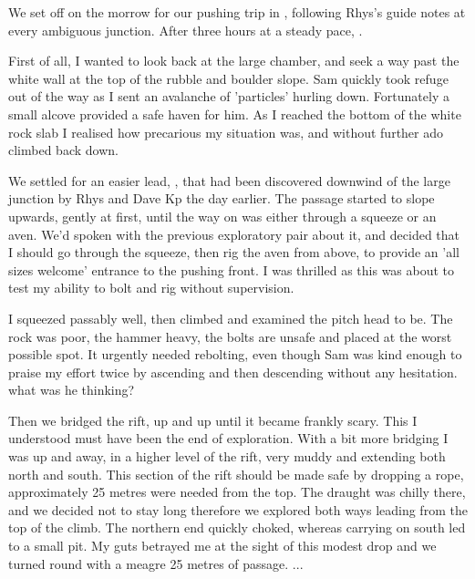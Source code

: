 We set off on the morrow for our pushing trip in , following Rhys's guide notes at every ambiguous junction. After three hours at a steady pace, .


First of all, I wanted to look back at the large  chamber, and seek a way past the white wall at the top of the rubble and boulder slope. Sam quickly took refuge out of the way as I sent an avalanche of 'particles' hurling down. Fortunately a small alcove provided a safe haven for him. As I reached the bottom of the white rock slab I realised how precarious my situation was, and without further ado climbed back down.

We settled for an easier lead, , that had been discovered downwind of the large junction by Rhys and Dave Kp the day earlier. The passage started to slope upwards, gently at first, until the way on was either through a squeeze or an aven. We'd spoken with the previous exploratory pair about it, and decided that I should go through the squeeze, then rig the aven from above, to provide an 'all sizes welcome' entrance to the pushing front. I was thrilled as this was about to test my ability to bolt and rig without supervision.

I squeezed passably well, then climbed and examined the pitch head to be. The rock was poor, the hammer heavy, the bolts are unsafe and placed at the worst possible spot. It urgently needed rebolting, even though Sam was kind enough to praise my effort twice by ascending and then descending without any hesitation. what was he thinking? 

Then we bridged the rift, up and up until it became frankly scary. This I understood must have been the end of exploration. With a bit more bridging I was up and away, in a higher level of the rift, very muddy and extending both north and south. This section of the rift should be made safe by dropping a rope, approximately 25 metres were needed from the top. The draught was chilly there, and we decided not to stay long therefore we explored both ways leading from the top of the climb. The northern end quickly choked, whereas carrying on south led to a small pit. My guts betrayed me at the sight of this modest drop and we turned round with a meagre 25 metres of passage. ... 

